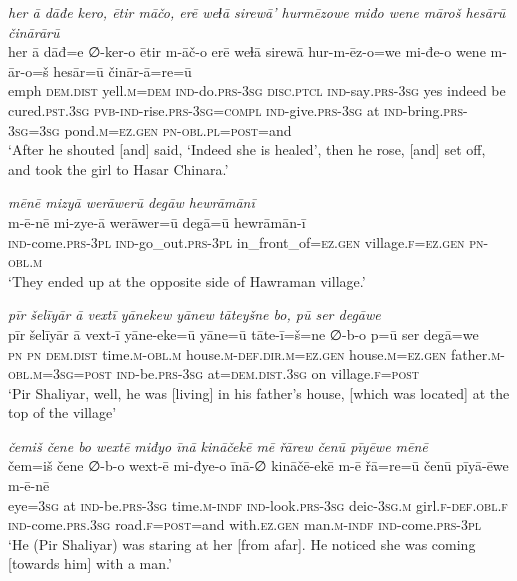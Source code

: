 \ea \label{ZP.61}
\textit{her ā dāđe kero, ētir māčo, erē weɫā sirewā’ hurmēzowe miđo wene māroš hesārū činārārū} \\ 
\gll her ā dāđ=e ∅-ker-o ētir m-āč-o erē weɫā sirewā hur-m-ēz-o=we mi-đe-o wene m-ār-o=š hesār=ū činār-ā=re=ū \\ 
 emph \textsc{dem.dist} yell\textsc{.m}\textsc{=dem} \textsc{ind-}do\textsc{.prs}\textsc{-3sg} \textsc{disc.ptcl} \textsc{ind-}say\textsc{.prs}\textsc{-3sg} yes indeed be cured\textsc{.pst}\textsc{.3sg} \textsc{pvb-}\textsc{ind-}rise\textsc{.prs}\textsc{-3sg}\textsc{=compl} \textsc{ind-}give\textsc{.prs}\textsc{-3sg} at \textsc{ind-}bring\textsc{.prs}\textsc{-3sg}\textsc{=3sg} pond\textsc{.m}\textsc{\textsc{=ez.gen}} \textsc{pn}\textsc{-obl}\textsc{.pl}\textsc{=\textsc{post}}=and \\ 
\glt `After he shouted [and] said, ‘Indeed she is healed’, then he rose, [and] set off, and took the girl to Hasar Chinara.'
\z 
 
\ea \label{ZP.62}
\textit{mēnē mizyā werāwerū degāw hewrāmānī} \\ 
\gll m-ē-nē mi-zye-ā werāwer=ū degā=ū hewrāmān-ī \\ 
 \textsc{ind-}come\textsc{.prs}\textsc{-3pl} \textsc{ind-}go\_out\textsc{.prs}\textsc{-3pl} in\_front\_of\textsc{\textsc{=ez.gen}} village\textsc{.f}\textsc{\textsc{=ez.gen}} \textsc{pn}\textsc{-obl}\textsc{.m} \\ 
\glt `They ended up at the opposite side of Hawraman village.'
\z 
 
\ea \label{ZP.65}
\textit{pīr šelīyār ā vextī yānekew yānew tāteyšne bo, pū ser degāwe} \\ 
\gll pīr šelīyār ā vext-ī yāne-eke=ū yāne=ū tāte-ī=š=ne ∅-b-o p=ū ser degā=we \\ 
 \textsc{pn} \textsc{pn} \textsc{dem.dist} time\textsc{.m}\textsc{-obl}\textsc{.m} house\textsc{.m}\textsc{-def}\textsc{.dir}\textsc{.m}\textsc{\textsc{=ez.gen}} house\textsc{.m}\textsc{\textsc{=ez.gen}} father\textsc{.m}\textsc{-obl}\textsc{.m}\textsc{=3sg}\textsc{=\textsc{post}} \textsc{ind-}be\textsc{.prs}\textsc{-3sg} at=\textsc{dem.dist}\textsc{.3sg} on village\textsc{.f}\textsc{=\textsc{post}} \\ 
\glt `Pir Shaliyar, well, he was [living] in his father’s house, [which was located] at the top of the village'
\z 
 
\ea \label{ZP.66}
\textit{čemiš čene bo wextē miđyo īnā kināčekē mē řārew čenū pīyēwe mēnē} \\ 
\gll čem=iš čene ∅-b-o wext-ē mi-đye-o īnā-∅ kināčē-ekē m-ē řā=re=ū čenū pīyā-ēwe m-ē-nē \\ 
 eye\textsc{=3sg} at \textsc{ind-}be\textsc{.prs}\textsc{-3sg} time\textsc{.m}\textsc{-indf} \textsc{ind-}look\textsc{.prs}\textsc{-3sg} deic\textsc{-3sg}\textsc{.m} girl\textsc{.f}\textsc{-def}\textsc{.obl}\textsc{.f} \textsc{ind-}come\textsc{.prs}\textsc{.3sg} road\textsc{.f}\textsc{=\textsc{post}}=and with\textsc{.ez.gen} man\textsc{.m}\textsc{-indf} \textsc{ind-}come\textsc{.prs}\textsc{-3pl} \\ 
\glt `He (Pir Shaliyar) was staring at her [from afar]. He noticed she was coming [towards him] with a man.'
\z 
 
